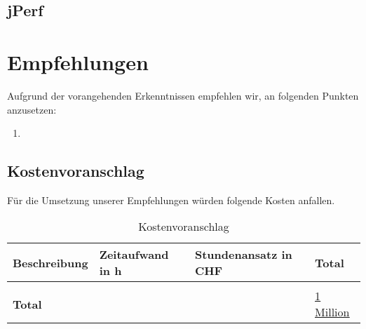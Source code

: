 


\subsection{jPerf}




\section{Empfehlungen}
Aufgrund der vorangehenden Erkenntnissen empfehlen wir, an folgenden Punkten anzusetzen:
\begin{enumerate}
	\item 
\end{enumerate}

\subsection{Kostenvoranschlag}
Für die Umsetzung unserer Empfehlungen würden folgende Kosten anfallen.
\begin{table}[h]
	\centering
	\begin{tabu} to \linewidth {l l l l}
		\toprule 
		Beschreibung & Zeitaufwand in h  & Stundenansatz in CHF & Total \\
		\midrule
		&&& \\
		\textbf{Total} & & & \underline{\underline{1 Million}} \\
		\bottomrule 
	\end{tabu} 
	\caption{Kostenvoranschlag}
\end{table}

